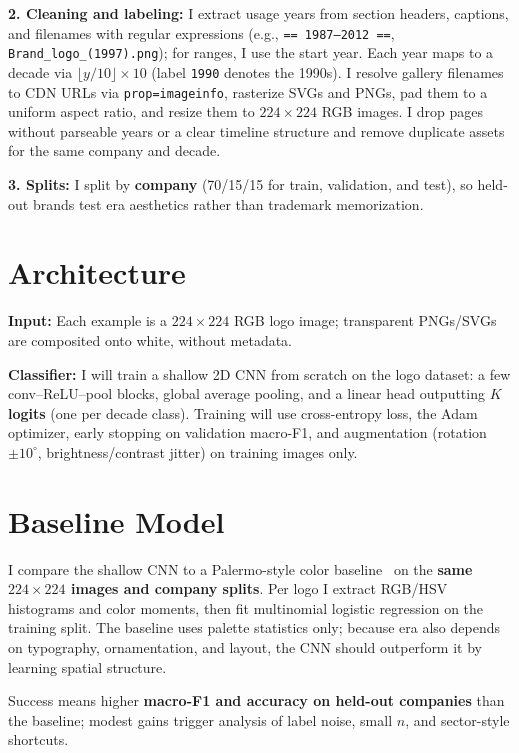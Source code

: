 \documentclass[final]{article}
\begin{document}
\textbf{2. Cleaning and labeling:}
I extract usage years from section headers, captions, and filenames with regular expressions (e.g., \texttt{== 1987--2012 ==}, \texttt{Brand\_logo\_(1997).png}); for ranges, I use the start year.
Each year maps to a decade via $\lfloor y/10 \rfloor \times 10$ (label \texttt{1990} denotes the 1990s).
I resolve gallery filenames to CDN URLs via \texttt{prop=imageinfo}, rasterize SVGs and PNGs, pad them to a uniform aspect ratio, and resize them to $224\times224$ RGB images.
I drop pages without parseable years or a clear timeline structure and remove duplicate assets for the same company and decade.

\textbf{3. Splits:}
I split by \textbf{company} (70/15/15 for train, validation, and test), so held-out brands test era aesthetics rather than trademark memorization.

\section*{Architecture}

\textbf{Input:}
Each example is a $224\times224$ RGB logo image; transparent PNGs/SVGs are composited onto white, without metadata.

\textbf{Classifier:}
I will train a shallow 2D CNN from scratch on the logo dataset: a few conv--ReLU--pool blocks, global average pooling, and a linear head outputting \textbf{$K$ logits} (one per decade class).
Training will use cross-entropy loss, the Adam optimizer, early stopping on validation macro-F1, and augmentation (rotation $\pm 10^\circ$, brightness/contrast jitter) on training images only.

\section*{Baseline Model}

I compare the shallow CNN to a Palermo-style color baseline~\cite{palermo2012dating} on the \textbf{same $224\times224$ images and company splits}.
Per logo I extract RGB/HSV histograms and color moments, then fit multinomial logistic regression on the training split.
The baseline uses palette statistics only; because era also depends on typography, ornamentation, and layout, the CNN should outperform it by learning spatial structure.

Success means higher \textbf{macro-F1 and accuracy on held-out companies} than the baseline; modest gains trigger analysis of label noise, small $n$, and sector-style shortcuts.
\end{document}
